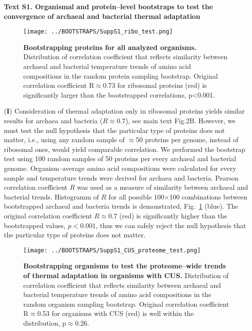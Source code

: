 \documentclass{report}
\begin{document}
{\bf Text S1. Organismal and protein--level bootstraps to test the convergence of archaeal and bacterial thermal adaptation }

\begin{figure}[h!]
	\centering
	\texttt{[image: ../BOOTSTRAPS/SuppS1\_ribo\_test.png]}
	\caption{
	{\bf Bootstrapping proteins for all analyzed organisms.} Distribution of correlation coefficient that reflects similarity between archaeal and bacterial temperature trends of amino acid compositions in the random protein sampling bootstrap. Original correlation coefficient R$\approx$0.73 for ribosomal proteins (red) is significantly larger than the bootstrapped correlations, p\textless0.001. 
	}
	\label{fig1}
\end{figure}

({\bf I})  Consideration of thermal adaptation only in ribosomal proteins yields similar results for archaea and bacteria ($R\approx0.7$), see main text Fig.2B. However, we must test the null hypothesis that the particular type of proteins does not matter, i.e., using any random sample of $\approx$50 proteins per genome, instead of ribosomal ones, would yield comparable correlation. We performed the bootstrap test using 100 random samples of 50 proteins per every archaeal and bacterial genome. Organism--average amino acid compositions were calculated for every sample and temperature trends were derived for archaea and bacteria. Pearson correlation coefficient $R$ was used as a measure of similarity between archaeal and bacterial trends. Histogramm of $R$ for all possible 100$\times$100 combinations between bootstrapped archaeal and bacteria trends is demonstrated, Fig.~\ref{fig1} (blue). The original correlation coefficient $R\approx0.7$ (red) is significantly higher than the bootstrapped values, $p<0.001$, thus we can safely reject the null hypothesis that the particular type of proteins does not matter.

\begin{figure}[h!]
	\centering
	\texttt{[image: ../BOOTSTRAPS/SuppS1\_CUS\_proteome\_test.png]}
	\caption{
	{\bf Bootstrapping organisms to test the proteome--wide trends of thermal adaptation in organisms with CUS.}
	Distribution of correlation coefficient that reflects similarity between archaeal and bacterial temperature trends of amino acid compositions in the random organism sampling bootstrap. Original correlation coefficient R$\approx$0.53 for organisms with CUS (red) is well within the distribution, p$\approx$0.26.
	}
	\label{fig2}
\end{figure}
\end{document}
